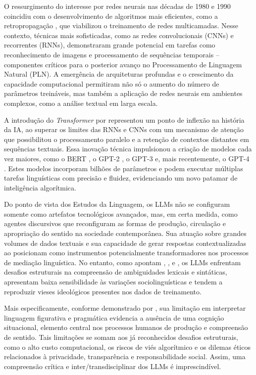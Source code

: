 \documentclass[portuguese]{textolivre}
\begin{document}
O ressurgimento do interesse por redes neurais nas décadas de 1980 e 1990 coincidiu com o desenvolvimento de algoritmos mais eficientes, como a retropropagação \cite{rumelhart1986}, que viabilizou o treinamento de redes multicamadas. Nesse contexto, técnicas mais sofisticadas, como as redes convolucionais (CNNs) e recorrentes (RNNs), demonstraram grande potencial em tarefas como reconhecimento de imagens e processamento de sequências temporais -- componentes críticos para o posterior avanço no Processamento de Linguagem Natural (PLN). A emergência de arquiteturas profundas e o crescimento da capacidade computacional \cite{zhao2003} permitiram não só o aumento do número de parâmetros treináveis, mas também a aplicação de redes neurais em ambientes complexos, como a análise textual em larga escala.

A introdução do \textit{Transformer} por \textcite{vaswani2017} representou um ponto de inflexão na história da IA, ao superar os limites das RNNs e CNNs com um mecanismo de atenção que possibilitou o processamento paralelo e a retenção de contextos distantes em sequências textuais. Essa inovação técnica impulsionou a criação de modelos cada vez maiores, como o BERT \cite{devlin2019}, o GPT-2 \cite{radford2019}, o GPT-3 \cite{brown2020} e, mais recentemente, o GPT-4 \cite{openai2023}. Estes modelos incorporam bilhões de parâmetros e podem executar múltiplas tarefas linguísticas com precisão e fluidez, evidenciando um novo patamar de inteligência algorítmica.

Do ponto de vista dos Estudos da Linguagem, os LLMs não se configuram somente como artefatos tecnológicos avançados, mas, em certa medida, como agentes discursivos que reconfiguram as formas de produção, circulação e apropriação do sentido na sociedade contemporânea. Sua atuação sobre grandes volumes de dados textuais e sua capacidade de gerar respostas contextualizadas ao posicionam como instrumentos potencialmente transformadores nos processos de mediação linguística. No entanto, como apontam \textcite{bender2020}, \textcite{blodgett2020}, \textcite{marcus2020} e \textcite{ortega-martin2023}, os LLMs enfrentam desafios estruturais na compreensão de ambiguidades lexicais e sintáticas, apresentam baixa sensibilidade às variações sociolinguísticas e tendem a reproduzir vieses ideológicos presentes nos dados de treinamento.

Mais especificamente, conforme demonstrado por \textcite{louwerse2011}, sua limitação em interpretar linguagem figurativa e pragmática evidencia a ausência de uma cognição situacional, elemento central nos processos humanos de produção e compreensão de sentido. Tais limitações se somam aos já reconhecidos desafios estruturais, como o alto custo computacional, os riscos de viés algorítmico \cite{bender2021} e os dilemas éticos relacionados à privacidade, transparência e responsabilidade social. Assim, uma compreensão crítica e inter/transdisciplinar dos LLMs é imprescindível.
\end{document}
